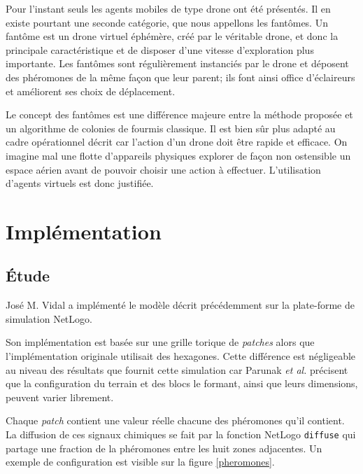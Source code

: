 \documentclass[12pt]{article}
\begin{document}
Pour l'instant seuls les agents mobiles de type drone ont été
présentés. Il en existe pourtant une seconde catégorie, que nous
appellons les fantômes. Un fantôme est un drone virtuel éphémère, créé
par le véritable drone, et donc la principale caractéristique et de
disposer d'une vitesse d'exploration plus importante. Les fantômes
sont régulièrement instanciés par le drone et déposent des phéromones
de la même façon que leur parent; ils font ainsi office d'éclaireurs
et améliorent ses choix de déplacement.

Le concept des fantômes est une différence majeure entre la méthode
proposée et un algorithme de colonies de fourmis classique. Il est
bien sûr plus adapté au cadre opérationnel décrit car l'action d'un
drone doit être rapide et efficace. On imagine mal une flotte
d'appareils physiques explorer de façon non ostensible un espace
aérien avant de pouvoir choisir une action à effectuer. L'utilisation
d'agents virtuels est donc justifiée.

\section{Implémentation}

\subsection{\'Etude}

José M. Vidal a implémenté le modèle décrit précédemment sur la
plate-forme de simulation NetLogo.

Son implémentation est basée sur une grille torique de
\textit{patches} alors que l'implémentation originale utilisait des
hexagones. Cette différence est négligeable au niveau des résultats
que fournit cette simulation car Parunak \textit{et al.} précisent que
la configuration du terrain et des blocs le formant, ainsi que leurs
dimensions, peuvent varier librement.

Chaque \textit{patch} contient une valeur réelle chacune des phéromones
qu'il contient. La diffusion de ces
signaux chimiques se fait par la fonction NetLogo \texttt{diffuse} qui
partage une fraction de la phéromones entre les huit zones
adjacentes. Un exemple de configuration est visible sur la figure
\ref{pheromones}.
\end{document}
